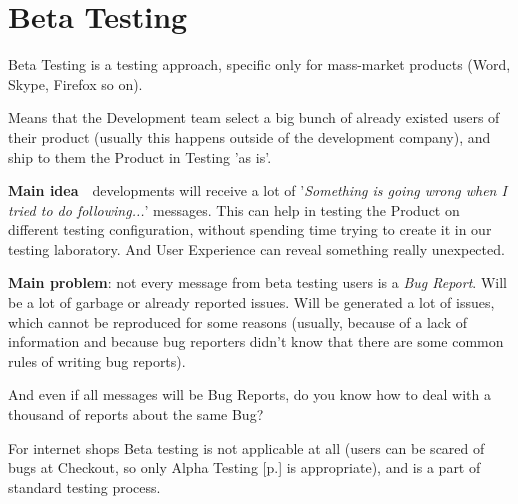 \section{Beta Testing}
\label{sec:Beta Testing}

Beta Testing is a testing approach, specific only for mass-market products (Word, Skype, Firefox so on).

Means that the Development team select a big bunch of already existed users of their product (usually this happens outside of the development company), and ship to them the Product in Testing 'as is'.

\textbf{Main idea}~\textemdash~developments will receive a lot of '\textit{Something is going wrong when I tried to do following...}' messages. This can help in testing the Product on different testing configuration, without spending time trying to create it in our testing laboratory. And User Experience can reveal something really unexpected.

\textbf{Main problem}: not every message from beta testing users is a \emph{Bug Report}. Will be a lot of garbage or already reported issues. Will be generated a lot of issues, which cannot be reproduced for some reasons (usually, because of a lack of information and because bug reporters didn't know that there are some common rules of writing bug reports).

And even if all messages will be Bug Reports, do you know how to deal with a thousand of reports about the same Bug? 

For internet shops Beta testing is not applicable at all (users can be scared of bugs at Checkout, so only Alpha Testing [p.\pageref{sec:Alpha Testing}] is appropriate), and is a part of standard testing process.
